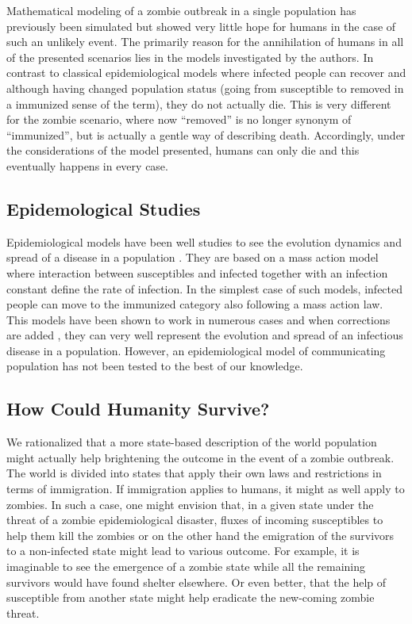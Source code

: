 \documentclass[11pt]{article} %
\begin{document}
Mathematical modeling of a zombie outbreak in a single population has previously been simulated \cite{munz2009zombies} but showed very little hope for humans in the case of such an unlikely event. The primarily reason for the annihilation of humans in all of the presented scenarios lies in the models investigated by the authors. In contrast to classical epidemiological models where infected people can recover and although having changed population status (going from susceptible to removed in a immunized sense of the term), they do not actually die. This is very different for the zombie scenario, where now ``removed'' is no longer synonym of ``immunized'', but is actually a gentle way of describing death. Accordingly, under the considerations of the model presented, humans can only die and this eventually happens in every case.

\subsection{Epidemological Studies}\indent

Epidemiological models have been well studies to see the evolution dynamics and spread of a disease in a population \cite{brauer2008compartmental}. They are based on a mass action model where interaction between susceptibles and infected together with an infection constant define the rate of infection. In the simplest case of such models, infected people can move to the immunized category also following a mass action law. This models have been shown to work in numerous cases and  when corrections are added \cite{m1925applications, stone2007seasonal}, they can very well represent the evolution and spread of an infectious disease in a population. However, an epidemiological model of communicating population has not been tested to the best of our knowledge.


\subsection{How Could Humanity Survive?}\indent

We rationalized that a more state-based description of the world population might actually help brightening the outcome in the event of a zombie outbreak. The world is divided into states that apply their own laws and restrictions in terms of immigration. If immigration applies to humans, it might as well apply to zombies. In such a case, one might envision that, in a given state under the threat of a zombie epidemiological disaster, fluxes of incoming susceptibles to help them kill the zombies or on the other hand the emigration of the survivors to a non-infected state might lead to various outcome. For example, it is imaginable to see the emergence of a zombie state while all the remaining survivors would have found shelter elsewhere. Or even better, that the help of susceptible from another state might help eradicate the new-coming zombie threat. 
\end{document}
